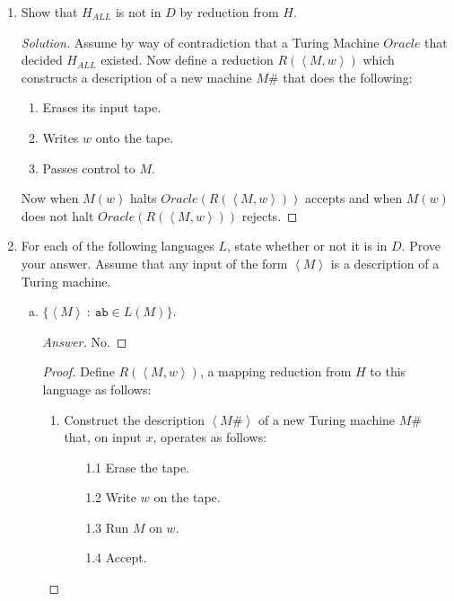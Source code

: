 \documentclass[10pt]{article}
\newcommand{\brackets}[1]{\left< #1 \right>}
\begin{document}
\begin{enumerate}[1)]

\item
Show that $H_{ALL}$ is not in $D$ by reduction from $H$.
\begin{proof}[Solution]
Assume by way of contradiction that a Turing Machine $Oracle$ that decided $H_{ALL}$ existed.  Now define a reduction $R(\brackets{M, w})$ which constructs a description of a  new machine $M\#$ that does the following:
\begin{enumerate}[1.]
\item
Erases its input tape.

\item
Writes $w$ onto the tape.

\item
Passes control to $M$.
\end{enumerate}

Now when $M(w)$ halts $Oracle(R(\brackets{M, w}))$ accepts and when $M(w)$ does not halt $Oracle(R(\brackets{M, w}))$ rejects.
\end{proof}



\item
For each of the following languages $L$, state whether or not it is in $D$.  Prove your answer.  Assume that any input of the form $\brackets{M}$ is a description of a Turing machine.
\begin{enumerate}[a)]

\item
$\{\brackets{M}\ :\ \texttt{ab} \in L(M)\}$.
\begin{proof}[Answer]
No.
\end{proof}
\begin{proof}[Proof]
Define $R(\brackets{M, w})$, a mapping reduction from $H$ to this language as follows:
\begin{enumerate}[1.]
\item
Construct the description $\brackets{M\#}$ of a new Turing machine $M\#$ that, on input $x$, operates as follows:
\begin{enumerate}
\item[1.1]
Erase the tape.

\item[1.2]
Write $w$ on the tape.

\item[1.3]
Run $M$ on $w$.

\item[1.4]
Accept.
\end{enumerate}


\end{enumerate}
\end{proof}
\end{enumerate}
\end{enumerate}
\end{document}
